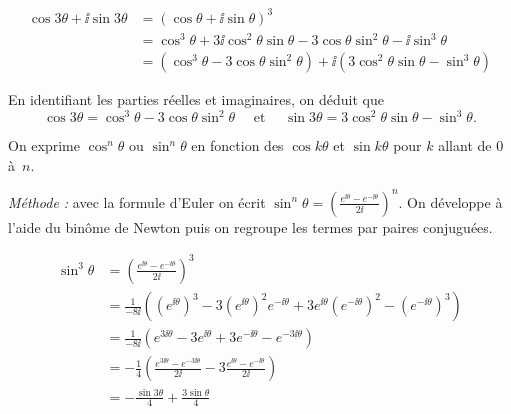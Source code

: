 \documentclass[10pt,class=article,crop=false]{standalone}
\begin{document}
\begin{multicols}{2}
\begin{exemple}
	\begin{equation*}
		\begin{split}
			\cos 3 \theta + \ii  \sin 3 \theta & =   \left( \cos \theta + \ii  \sin \theta
			\right)^3\\
			& =  \cos^3 \theta + 3 \ii  \cos^2 \theta \sin \theta - 3 \cos \theta \sin^2
			\theta - \ii  \sin^3 \theta\\
			& =  \left( \cos^3 \theta - 3 \cos \theta \sin^2 \theta \right) + \ii  \left(
			3 \cos^2 \theta \sin \theta - \sin^3 \theta \right)
		\end{split}
	\end{equation*}
	
	En identifiant les parties réelles et imaginaires, on déduit que
	\[ \cos 3 \theta = \cos^3 \theta - 3 \cos \theta \sin^2 \theta \quad \text{ et } \quad
	\sin 3 \theta = 3 \cos^2 \theta \sin \theta - \sin^3 \theta . \]
	
\end{exemple}

  On exprime
$\cos^n \theta$ ou $\sin^n \theta$ en fonction des $\cos k \theta$ et $\sin k
\theta$ pour $k$ allant de $0$ \`a~$n$.

\medskip

\emph{Méthode :} avec la formule d'Euler on écrit $\sin^n \theta = \left( \frac{e^{\ii
		\theta} - e^{- \ii  \theta}}{2 \ii } \right)^n$. On développe à l'aide du binôme de Newton
puis on regroupe les termes par paires conjugu\'ees.

\begin{exemple}
	\begin{equation*}
		\begin{split}
			\sin^3 \theta & =  \left( \frac{e^{\ii  \theta} - e^{- \ii  \theta}}{2 \ii }
			\right)^3 \\
			& =  \frac{1}{- 8 \ii }  \left( (e^{\ii  \theta})^3 - 3 (e^{\ii  \theta})^2e^{- \ii  \theta}
			+ 3 e^{\ii  \theta}(e^{-\ii  \theta})^2 - (e^{- \ii  \theta})^3 \right)\\
			& =  \frac{1}{- 8 \ii }  \left( e^{3 \ii  \theta} - 3 e^{\ii  \theta} + 3 e^{-
				\ii  \theta} - e^{- 3 \ii  \theta} \right)\\
			& =  - \frac{1}{4} \left( \frac{e^{3 \ii  \theta} -  e^{-3 \ii \theta}}{2 \ii } - 3
			\frac{e^{\ii  \theta} - e^{-\ii  \theta}}{2 \ii } \right) \\
			& =  - \frac{\sin 3 \theta}{4}
			+ \frac{3 \sin \theta}{4}
		\end{split}
	\end{equation*}
\end{exemple}




\end{multicols}
\end{document}
